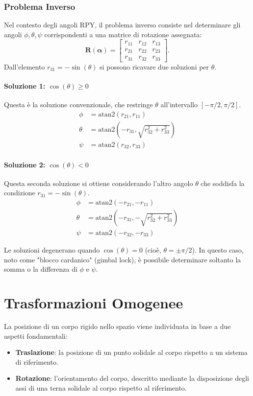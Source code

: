 ﻿\documentclass[11pt, a4paper]{article}
\begin{document}
\newpage
\subsubsection{Problema Inverso}
Nel contesto degli angoli RPY, il problema inverso consiste nel determinare gli angoli $\phi, \theta, \psi$ corrispondenti a una matrice di rotazione assegnata:
\[
    \mathbf{R}(\boldsymbol{\alpha}) =
    \begin{bmatrix}
        r_{11} & r_{12} & r_{13}\\
        r_{21} & r_{22} & r_{23}\\
        r_{31} & r_{32} & r_{33}
    \end{bmatrix}.
\]
Dall'elemento $r_{31} = -\sin(\theta)$ si possono ricavare due soluzioni per $\theta$.

\paragraph{Soluzione 1: $\cos(\theta) \ge 0$}
Questa è la soluzione convenzionale, che restringe $\theta$ all'intervallo $[-\pi/2, \pi/2]$.
\begin{align*}
    \phi &= \text{atan2}(r_{21}, r_{11}) \\
    \theta &= \text{atan2}\left(-r_{31}, \sqrt{r_{32}^2 + r_{33}^2}\right) \\
    \psi &= \text{atan2}(r_{32}, r_{33})
\end{align*}

\paragraph{Soluzione 2: $\cos(\theta) < 0$}
Questa seconda soluzione si ottiene considerando l'altro angolo $\theta$ che soddisfa la condizione $r_{31} = -\sin(\theta)$.
\begin{align*}
    \phi &= \text{atan2}(-r_{21}, -r_{11}) \\
    \theta &= \text{atan2}\left(-r_{31}, -\sqrt{r_{32}^2 + r_{33}^2}\right) \\
    \psi &= \text{atan2}(-r_{32}, -r_{33})
\end{align*}

Le soluzioni degenerano quando $\cos(\theta) = 0$ (cioè, $\theta = \pm\pi/2$). In questo caso, noto come "blocco cardanico" (gimbal lock), è possibile determinare soltanto la somma o la differenza di $\phi$ e $\psi$.
\newpage
\section{Trasformazioni Omogenee}
La posizione di un corpo rigido nello spazio viene individuata in base a due aspetti fondamentali:
\begin{itemize}
    \item \textbf{Traslazione}: la posizione di un punto solidale al corpo rispetto a un sistema di riferimento.
    \item \textbf{Rotazione}: l'orientamento del corpo, descritto mediante la disposizione degli assi di una terna solidale al corpo rispetto al riferimento.
\end{itemize}
\end{document}
